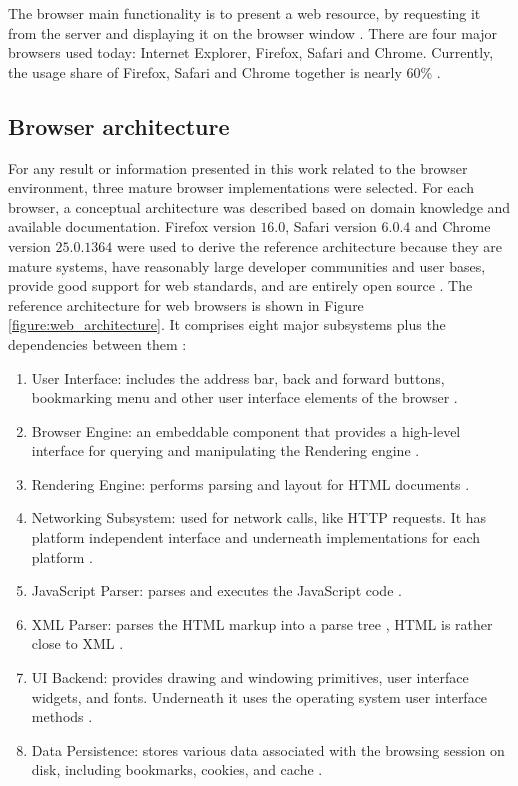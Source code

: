 The browser main functionality is to present a web resource, by requesting it from the server and displaying it on the browser window \cite{Traffic2013}. There are four major browsers used today: Internet Explorer, Firefox, Safari and Chrome. Currently, the usage share of Firefox, Safari and Chrome together is nearly 60\% \cite{Traffic2013}.


\subsection{Browser architecture} %
\label{sub:basic_concepts:web:browser_architecture}

For any result or information presented in this work related to the browser environment, three mature browser implementations were selected. For each browser, a conceptual architecture was described based on domain knowledge and available documentation. Firefox version $16.0$, Safari version $6.0.4$ and Chrome version $25.0.1364$ were used to derive the reference architecture because they are mature systems, have reasonably large developer communities and user bases, provide good support for web standards, and are entirely open source \cite{WC2006,Grosskurth2005}. The reference architecture for web browsers is shown in Figure \ref{figure:web_architecture}. It comprises eight major subsystems plus the dependencies between them \cite{Grosskurth2005}:

\begin{enumerate}
  \item User Interface: includes the address bar, back and forward buttons, bookmarking menu and other user interface elements of the browser \cite{Grosskurth2005}.
  \item Browser Engine: an embeddable component that provides a high-level interface for querying and manipulating the Rendering engine \cite{Grosskurth2005,Rocks2013}.
  \item Rendering Engine: performs parsing and layout for HTML documents \cite{Grosskurth2005,Rocks2013}.
  \item Networking Subsystem: used for network calls, like HTTP requests. It has platform independent interface and underneath implementations for each platform \cite{Grosskurth2005,Rocks2013}.
  \item JavaScript Parser: parses and executes the JavaScript \cite{International2009} code \cite{Grosskurth2005}.
  \item XML Parser: parses the HTML markup into a parse tree \cite{Hickson2013}, HTML is rather close to XML \cite{Rocks2013,Hickson2013}.
  \item UI Backend: provides drawing and windowing primitives, user interface widgets, and fonts. Underneath it uses the operating system user interface methods \cite{Grosskurth2005}.
  \item Data Persistence: stores various data associated with the browsing session on disk, including bookmarks, cookies, and cache \cite{Grosskurth2005,Rocks2013}.
\end{enumerate}

